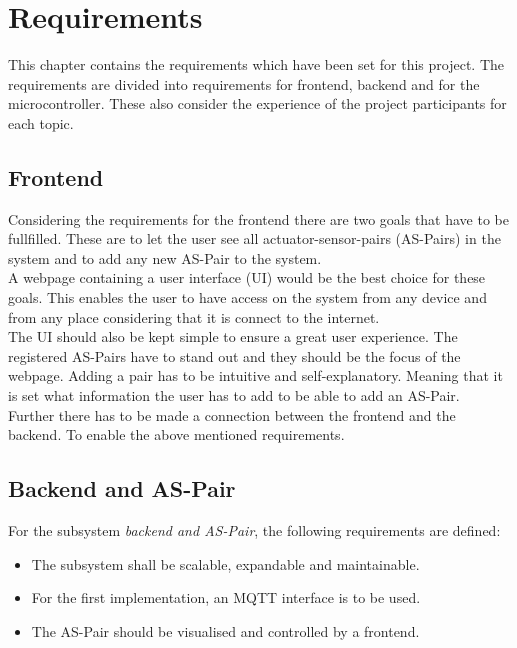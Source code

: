 \section{Requirements}\label{req}
This chapter contains the requirements which have been set for this project. The requirements are divided into requirements for frontend, backend and for the microcontroller. These also consider the experience of the project participants for each topic. \\ 

\subsection{Frontend} \label{reqfront}
Considering the requirements for the frontend there are two goals that have to be fullfilled. These are to let the user see all actuator-sensor-pairs (AS-Pairs) in the system and to add any new AS-Pair to the system. \\

A webpage containing a user interface (UI) would be the best choice for these goals. This enables the user to have access on the system from any device and from any place considering that it is connect to the internet. \\

The UI should also be kept simple to ensure a great user experience. The registered AS-Pairs have to stand out and they should be the focus of the webpage. Adding a pair has to be intuitive and self-explanatory. Meaning that it is set what information the user has to add to be able to add an AS-Pair. \\

Further there has to be made a connection between the frontend and the backend. To enable the above mentioned requirements. \\ 

\subsection{Backend and AS-Pair} 

For the subsystem \textit{backend and AS-Pair}, the following requirements are defined:
\begin{itemize}
    \item The subsystem shall be scalable, expandable and maintainable.
    \item For the first implementation, an MQTT interface is to be used.
    \item The AS-Pair should be visualised and controlled by a frontend.
\end{itemize}